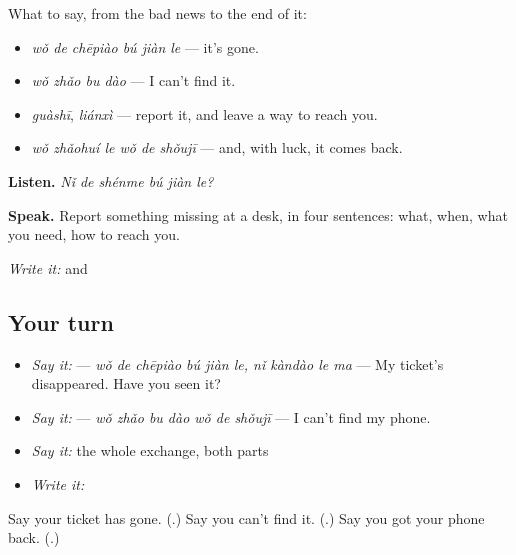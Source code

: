 \begin{grammarlens}[title={What you've built — when something goes missing}]
What to say, from the bad news to the end of it:

\begin{itemize}
\raggedright
  \item \textbf{} \emph{wǒ de chēpiào bú jiàn le} — it's gone.
  \item \textbf{} \emph{wǒ zhǎo bu dào} — I can't find it.
  \item \emph{guàshī}, \emph{liánxì} — report it, and leave a way to reach you.
  \item \textbf{} \emph{wǒ zhǎohuí le wǒ de shǒujī} — and, with luck, it comes back.
\end{itemize}

\textbf{Listen.} \emph{Nǐ de shénme bú jiàn le?}

\textbf{Speak.} Report something missing at a desk, in four sentences: what, when, what you need, how to reach you.

\emph{Write it:}  and 
\end{grammarlens}

\subsection*{Your turn}
\begin{itemize}
\raggedright
  \item \emph{Say it:}   — \emph{wǒ de chēpiào bú jiàn le, nǐ kàndào le ma} — My ticket's disappeared. Have you seen it?
  \item \emph{Say it:}  — \emph{wǒ zhǎo bu dào wǒ de shǒujī} — I can't find my phone.
  \item \emph{Say it:} the whole exchange, both parts
  \item \emph{Write it:} 
\end{itemize}

\begin{tcolorbox}[breakable,colback=teal!4,colframe=teal!35!black,title={Before you move on}]
Say your ticket has gone. (\textbf{}.) Say you can't find it. (\textbf{}.) Say you got your phone back. (\textbf{}.)
\end{tcolorbox}
